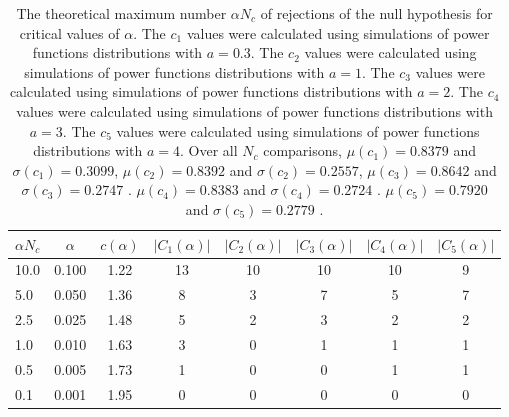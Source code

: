 \begin{table}[h!]
\begin{center}
\begin{tabular}{| l | c | c | c | c | c | c | c |}\hline
$\alpha N_c$ & $\alpha$ & $c(\alpha)$ & $|C_1(\alpha)|$ & $|C_2(\alpha)|$ & $|C_3(\alpha)|$ & $|C_4(\alpha)|$ & $|C_5(\alpha)|$ \\\hline
10.0 & 0.100 & 1.22 & 13 & 10 & 10 & 10 & 9 \\\hline
5.0 & 0.050 & 1.36 & 8 & 3 & 7 & 5 & 7 \\\hline
2.5 & 0.025 & 1.48 & 5 & 2 & 3 & 2 & 2 \\\hline
1.0 & 0.010 & 1.63 & 3 & 0 & 1 & 1 & 1 \\\hline
0.5 & 0.005 & 1.73 & 1 & 0 & 0 & 1 & 1 \\\hline
0.1 & 0.001 & 1.95 & 0 & 0 & 0 & 0 & 0 \\\hline
\end{tabular}
\caption{The theoretical maximum number $\alpha N_c$ of rejections
        of the null hypothesis for critical values of $\alpha$.
        The $c_1$ values were calculated using simulations of power functions distributions with $a=0.3$.
        The $c_2$ values were calculated using simulations of power functions distributions with $a=1$.
        The $c_3$ values were calculated using simulations of power functions distributions with $a=2$.
        The $c_4$ values were calculated using simulations of power functions distributions with $a=3$.
        The $c_5$ values were calculated using simulations of power functions distributions with $a=4$.
        Over all $N_c$ comparisons,
         $\mu(c_1)=0.8379$ and $\sigma(c_1)=0.3099$,
         $\mu(c_2)=0.8392$ and $\sigma(c_2)=0.2557$,
         $\mu(c_3)=0.8642$ and $\sigma(c_3)=0.2747$ .
         $\mu(c_4)=0.8383$ and $\sigma(c_4)=0.2724$ .
         $\mu(c_5)=0.7920$ and $\sigma(c_5)=0.2779$ .
        }
\end{center}
\end{table}